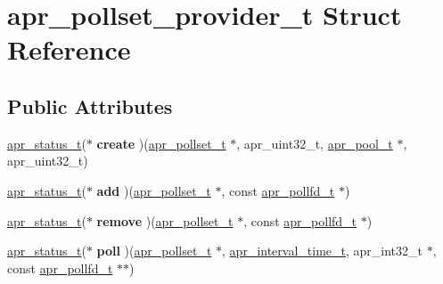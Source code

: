 \hypertarget{structapr__pollset__provider__t}{}\section{apr\+\_\+pollset\+\_\+provider\+\_\+t Struct Reference}
\label{structapr__pollset__provider__t}
\subsection*{Public Attributes}
\begin{DoxyCompactItemize}
\item 
\mbox{\label{structapr__pollset__provider__t_afa43fa6c93bf2a650b1320811e7d0f46}} 
\mbox{\hyperlink{group__apr__errno_gaf76ee4543247e9fb3f3546203e590a6c}{apr\+\_\+status\+\_\+t}}($\ast$ {\bfseries create} )(\mbox{\hyperlink{structapr__pollset__t}{apr\+\_\+pollset\+\_\+t}} $\ast$, apr\+\_\+uint32\+\_\+t, \mbox{\hyperlink{group__apr__pools_gaf137f28edcf9a086cd6bc36c20d7cdfb}{apr\+\_\+pool\+\_\+t}} $\ast$, apr\+\_\+uint32\+\_\+t)
\item 
\mbox{\label{structapr__pollset__provider__t_a177f6f0a4134e478a7ba59f6c113cae6}} 
\mbox{\hyperlink{group__apr__errno_gaf76ee4543247e9fb3f3546203e590a6c}{apr\+\_\+status\+\_\+t}}($\ast$ {\bfseries add} )(\mbox{\hyperlink{structapr__pollset__t}{apr\+\_\+pollset\+\_\+t}} $\ast$, const \mbox{\hyperlink{structapr__pollfd__t}{apr\+\_\+pollfd\+\_\+t}} $\ast$)
\item 
\mbox{\label{structapr__pollset__provider__t_abe81d05aa0123864fff065052ab57ac6}} 
\mbox{\hyperlink{group__apr__errno_gaf76ee4543247e9fb3f3546203e590a6c}{apr\+\_\+status\+\_\+t}}($\ast$ {\bfseries remove} )(\mbox{\hyperlink{structapr__pollset__t}{apr\+\_\+pollset\+\_\+t}} $\ast$, const \mbox{\hyperlink{structapr__pollfd__t}{apr\+\_\+pollfd\+\_\+t}} $\ast$)
\item 
\mbox{\label{structapr__pollset__provider__t_a3b27b07f7ec4170af1e8d2206c759fd9}} 
\mbox{\hyperlink{group__apr__errno_gaf76ee4543247e9fb3f3546203e590a6c}{apr\+\_\+status\+\_\+t}}($\ast$ {\bfseries poll} )(\mbox{\hyperlink{structapr__pollset__t}{apr\+\_\+pollset\+\_\+t}} $\ast$, \mbox{\hyperlink{group__apr__time_gaae2129185a395cc393f76fabf4f43e47}{apr\+\_\+interval\+\_\+time\+\_\+t}}, apr\+\_\+int32\+\_\+t $\ast$, const \mbox{\hyperlink{structapr__pollfd__t}{apr\+\_\+pollfd\+\_\+t}} $\ast$$\ast$)
$$
\end{DoxyCompactItemize}
